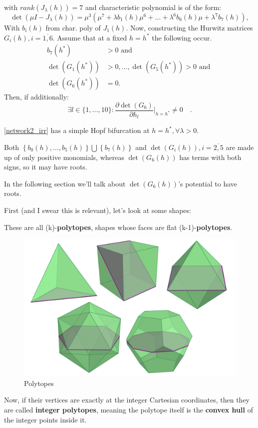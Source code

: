 with $rank(J_\lambda(h)) = 7$ and characteristic polynomial is of the form:
\[
	\det\left(\mu I-J_\lambda(h)\right)=\mu^3\left(\mu^7+\lambda b_1(h)\mu^6+\ldots+\lambda^6b_6(h)\mu+\lambda^7b_7(h)\right),
\]
With $b_i(h)$ from char. poly of $J_1(h)$.
Now, constructing the Hurwitz matrices $G_i(h), i = \overline{1,6}$. Assume that at a fixed $h = h^*$ the following occur.
\begin{equation}\label{bifurcation_main_condition}
	\begin{aligned}
		b_{7}(h^{*})&>0 \text{ and } \\
		\det(G_1(h^*))&>0,\ldots,\det(G_5(h^*))>0 \text{ and }\\
		\det(G_6(h^*))&=0.
	\end{aligned}
\end{equation}
Then, if additionally:
\begin{equation}\label{bifurcation_transversality_condition}
	\exists l\in\{1,\ldots,10\} : \frac{\partial\det(G_6)}{\partial h_l}|_{h=h^*}\neq0\quad.
\end{equation}

\ref{network2_irr} has a simple Hopf bifurcation at $h = h^*, \forall \lambda > 0$.

Both $\left\{ b_0(h), \ldots, b_5(h) \right\} \bigcup \left\{   b_7(h) \right\}$ and
$\det(G_i(h)), i = \overline{2,5}$ are made up of only positive monomials, whereas $\det(G_6(h))$ has terms with both signs, so it may have roots.

In the following section we'll talk about $\det(G_6(h))$'s potential to have roots.

First (and I swear this is relevant), let's look at some shapes:

These are all (k)-\textbf{polytopes}, shapes whose faces are flat (k-1)-\textbf{polytopes}.
\begin{figure}[H]
	\centering
	\includegraphics[width=13cm]{math_pics/polytopes.png}
	\caption{Polytopes \cite{Brandenburg2024}}
\end{figure}
Now, if their vertices are exactly at the integer Cartesian coordinates, then they are called \textbf{integer polytopes}, meaning the polytope itself is the \textbf{convex hull} of the integer points inside it.

